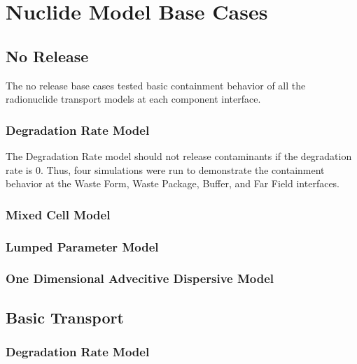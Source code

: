 \section{Nuclide Model Base Cases}\label{sec:nuclide_base_cases}
\subsection{No Release}
The no release base cases tested basic containment behavior of all the 
radionuclide transport models at each component interface. 

\subsubsection{Degradation Rate Model}
The Degradation Rate model should not release contaminants if the degradation 
rate is 0. Thus, four simulations were run to demonstrate the containment 
behavior at the Waste Form, Waste Package, Buffer, and Far Field interfaces. 



\subsubsection{Mixed Cell Model}



\subsubsection{Lumped Parameter Model}



\subsubsection{One Dimensional Advecitive Dispersive Model}



\subsection{Basic Transport}

\subsubsection{Degradation Rate Model}

